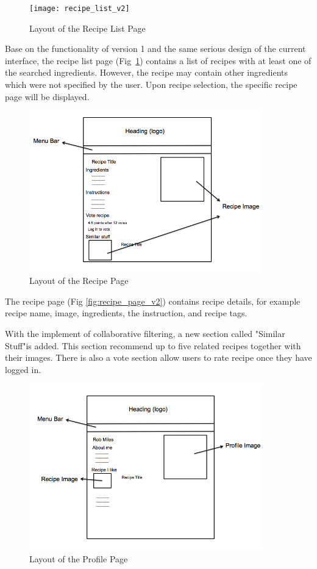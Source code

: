 \begin{figure}[H]
\texttt{[image: recipe\_list\_v2]}
\caption{Layout of the Recipe List Page}
\label{fig:recipe_list_v2}
\end{figure}

Base on the functionality of version 1 and the same serious design of the current interface, the recipe list page (Fig~\ref{fig:recipe_list_v2}) contains a list of recipes with at least one of the searched ingredients. However, the recipe may contain other ingredients which were not specified by the user. Upon recipe selection, the specific recipe page will be displayed.

\begin{figure}[H]
\includegraphics[width=0.9\textwidth]{recipe_page_v2}
\caption{Layout of the Recipe Page}
\label{fig:recipe_page}
\end{figure}

The recipe page (Fig \ref{fig:recipe_page_v2}) contains recipe details, for example recipe name, image, ingredients, the instruction, and recipe tags.
 
 With the implement of collaborative filtering, a new section called "Similar Stuff"is added. This section recommend up to five related recipes together with their images. There is also a vote section allow users to rate recipe once they have logged in.
 
 \begin{figure}[H]
\includegraphics[width=0.9\textwidth]{profile_page_v2}
\caption{Layout of the Profile Page}
\label{fig:profile_page_v2}
\end{figure}

